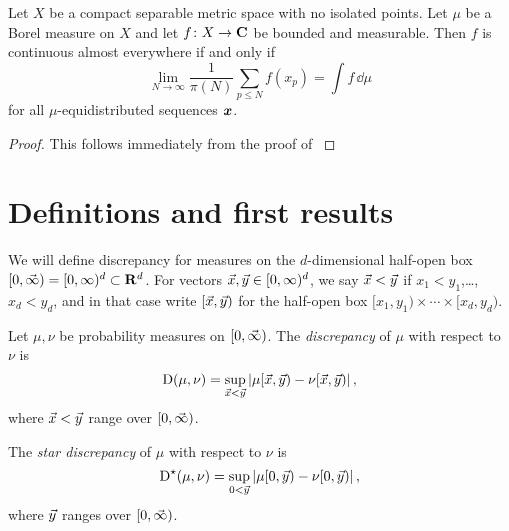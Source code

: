 \begin{theorem}
Let $X$ be a compact separable metric space with no isolated points. Let $\mu$ 
be a Borel measure on $X$ and let $f\colon X\to \mathbf{C}$ be bounded and measurable. 
Then $f$ is continuous almost everywhere if and only if 
\[
	\lim_{N\to \infty} \frac{1}{\pi(N)} \sum_{p\leqslant N} f(x_p) = \int f\, \dd\mu
\]
for all $\mu$-equidistributed sequences ${\boldsymbol x}$. 
\end{theorem}
\begin{proof}
This follows immediately from the proof of \cite[Th.~1]{mazzone-1995}
\end{proof}





\section{Definitions and first results}

We will define discrepancy for measures on the $d$-dimensional half-open box 
$[0,\vec{\infty}) = [0,\infty)^d\subset \mathbf{R}^d$. For vectors 
$\vec{x},\vec{y}\in [0,\infty)^d$, we say $\vec{x}<\vec{y}$ if $x_1<y_1$,\dots,$x_d<y_d$, and 
in that case write $[\vec{x},\vec{y})$ for the half-open box 
$[x_1,y_1)\times \cdots \times [x_d,y_d)$. 

\begin{definition}
Let $\mu, \nu$ be probability measures on $[0,\vec{\infty})$. The 
\emph{discrepancy} of $\mu$ with respect to $\nu$ is 
\[
	\operatorname{D}(\mu,\nu) = \sup_{\vec{x} < \vec{y}} \left| \mu[\vec{x},\vec{y}) - \nu[\vec{x},\vec{y})\right| ,
\]
where $\vec{x}<\vec{y}$ range over $[0,\vec{\infty})$.

The \emph{star discrepancy} of $\mu$ with respect to $\nu$ is 
\[
	\operatorname{D}^\star(\mu,\nu) = \sup_{0<\vec{y}} \left| \mu[0,\vec{y}) - \nu[0,\vec{y})\right| ,
\]
where $\vec{y}$ ranges over $[0,\vec{\infty})$. 
\end{definition}

